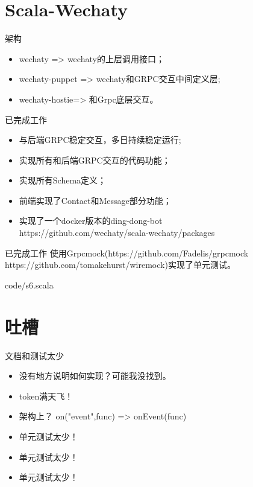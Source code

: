 \documentclass[10pt,aspectratio=43,mathserif,table]{beamer}
\begin{document}
\section{Scala-Wechaty}
\begin{frame}{架构}
  \begin{itemize}
    \item<1-> wechaty => wechaty的上层调用接口；
    \item<1-> wechaty-puppet => wechaty和GRPC交互中间定义层;
    \item<1-> wechaty-hostie=> 和Grpc底层交互。
  \end{itemize}
\end{frame}
\begin{frame}{已完成工作}
  \begin{itemize}
    \item<1-> 与后端GRPC稳定交互，多日持续稳定运行;
    \item<1-> 实现所有和后端GRPC交互的代码功能；
    \item<1-> 实现所有Schema定义；
    \item<1-> 前端实现了Contact和Message部分功能；
    \item<1-> 实现了一个docker版本的ding-dong-bot\\https://github.com/wechaty/scala-wechaty/packages
  \end{itemize}
\end{frame}
\begin{frame}{已完成工作}
    使用Grpcmock(https://github.com/Fadelis/grpcmock https://github.com/tomakehurst/wiremock)实现了单元测试。
  
  {code/s6.scala}
\end{frame}

\section{吐槽}
\begin{frame}{文档和测试太少}
  \begin{itemize}
    \item<1-> 没有地方说明如何实现？可能我没找到。
    \item<1-> token满天飞！
    \item<1-> 架构上？ on("event",func) => onEvent(func)
    \item<1-> 单元测试太少！
    \item<1-> 单元测试太少！
    \item<1-> 单元测试太少！
  \end{itemize}
\end{frame}
\end{document}
